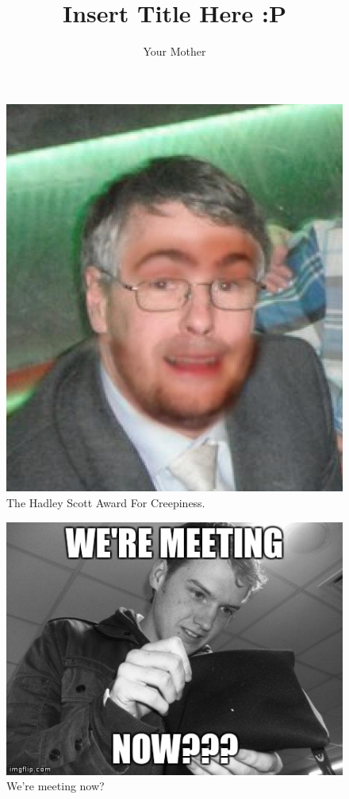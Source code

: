 \documentclass[11pt]{report}
\begin{document}
\title{Insert Title Here :P} 
\author{Your Mother}
\maketitle
\thispagestyle{empty}
\newpage


\newpage

\newpage

\newpage


\begin{figure}[h]
\begin{center}
\includegraphics[scale=0.4]{./design/542749_10151334664783073_750339761_n} 
\end{center}
\caption{The Hadley Scott Award For Creepiness.}
\label{fig:the hadley scott award for creepiness}
\end{figure} 

\begin{figure}[h]
\begin{center}
\includegraphics[scale=0.4]{./design/nathan} 
\end{center}
\caption{We're meeting now?}
\label{fig:we're meeting now?}
\end{figure} 

\newpage

\newpage

\newpage



\end{document}
